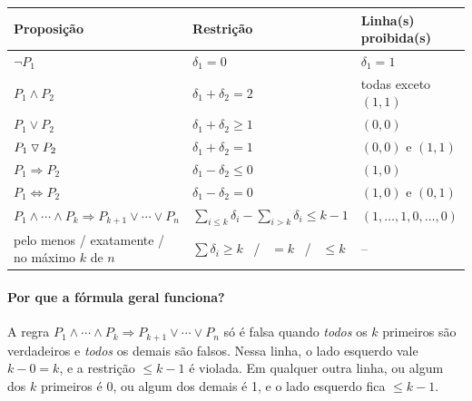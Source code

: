 \begin{center}
\small
\begin{tabularx}{\linewidth}{>{\raggedright\arraybackslash}X l >{\raggedright\arraybackslash}p{3.1cm}}
\toprule
Proposição & Restrição & Linha(s) proibida(s)\\
\midrule
$\neg P_1$ & $\delta_1=0$ & $\delta_1=1$\\
$P_1\wedge P_2$ & $\delta_1+\delta_2=2$ & todas exceto $(1,1)$\\
$P_1\vee P_2$ & $\delta_1+\delta_2\ge1$ & $(0,0)$\\
$P_1\mathbin{\triangledown} P_2$ & $\delta_1+\delta_2=1$ & $(0,0)$ e $(1,1)$\\
$P_1\Rightarrow P_2$ & $\delta_1-\delta_2\le0$ & $(1,0)$\\
$P_1\Leftrightarrow P_2$ & $\delta_1-\delta_2=0$ & $(1,0)$ e $(0,1)$\\
$P_1\wedge\cdots\wedge P_k\Rightarrow P_{k+1}\vee\cdots\vee P_n$ & $\sum_{i\le k}\delta_i-\sum_{i>k}\delta_i\le k-1$ & $(1,\dots,1,0,\dots,0)$\\
pelo menos / exatamente / no máximo $k$ de $n$ & $\sum\delta_i\ge k$ \ / \ $=k$ \ / \ $\le k$ & --\\
\bottomrule
\end{tabularx}
\end{center}

\paragraph{Por que a fórmula geral funciona?} A regra
$P_1\wedge\cdots\wedge P_k\Rightarrow P_{k+1}\vee\cdots\vee P_n$ só é falsa quando \emph{todos} os $k$ primeiros
são verdadeiros e \emph{todos} os demais são falsos. Nessa linha, o lado esquerdo vale $k-0=k$, e a restrição
$\le k-1$ é violada. Em qualquer outra linha, ou algum dos $k$ primeiros é 0, ou algum dos demais é 1, e o lado
esquerdo fica $\le k-1$.

